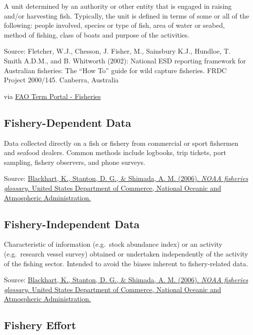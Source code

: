\documentclass[
  11pt,
]{book}
\begin{document}
A unit determined by an authority or other entity that is engaged in raising and/or harvesting fish. Typically, the unit is defined in terms of some or all of the following: people involved, species or type of fish, area of water or seabed, method of fishing, class of boats and purpose of the activities.

Source: Fletcher, W.J., Chesson, J. Fisher, M., Sainsbury K.J., Hundloe, T. Smith A.D.M., and B. Whitworth (2002): National ESD reporting framework for Australian fisheries: The ``How To'' guide for wild capture fisheries. FRDC Project 2000/145. Canberra, Australia

via \href{http://www.fao.org/fishery/glossary/en}{FAO Term Portal - Fisheries}

\hypertarget{fishery-dependent-data}{%
\subsection{Fishery-Dependent Data}\label{fishery-dependent-data}}

Data collected directly on a fish or fishery from commercial or sport fishermen and seafood dealers. Common methods include logbooks, trip tickets, port sampling, fishery observers, and phone surveys.

Source: \href{https://repository.library.noaa.gov/view/noaa/12856}{Blackhart, K., Stanton, D. G., \& Shimada, A. M. (2006). \emph{NOAA fisheries glossary.} United States Department of Commerce, National Oceanic and Atmospheric Administration.}

\hypertarget{fishery-independent-data}{%
\subsection{Fishery-Independent Data}\label{fishery-independent-data}}

Characteristic of information (e.g.~stock abundance index) or an activity (e.g.~research vessel survey) obtained or undertaken independently of the activity of the ﬁshing sector. Intended to avoid the biases inherent to ﬁshery-related data.

Source: \href{https://repository.library.noaa.gov/view/noaa/12856}{Blackhart, K., Stanton, D. G., \& Shimada, A. M. (2006). \emph{NOAA fisheries glossary.} United States Department of Commerce, National Oceanic and Atmospheric Administration.}

\hypertarget{fishery-effort}{%
\subsection{Fishery Effort}\label{fishery-effort}}
\end{document}
